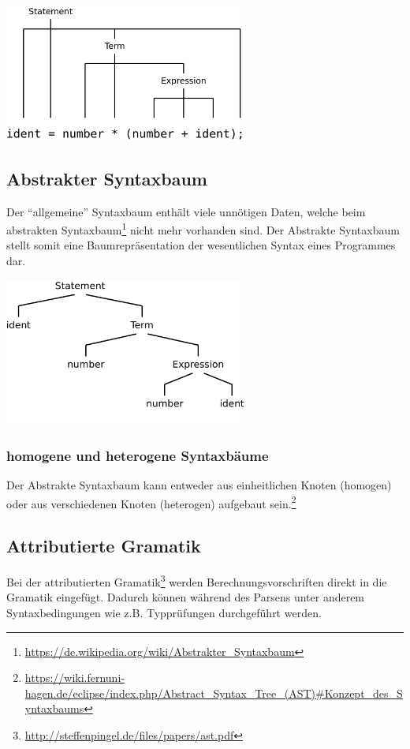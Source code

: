 \includegraphics[width=0.6\textwidth]{./media/images/compiler/parser_syntaxtree.png}

\subsection{Abstrakter Syntaxbaum}

Der ``allgemeine'' Syntaxbaum enth\"alt viele unn\"otigen Daten, welche beim abstrakten Syntaxbaum\footnote{\url{https://de.wikipedia.org/wiki/Abstrakter_Syntaxbaum}} nicht mehr vorhanden sind. Der Abstrakte Syntaxbaum stellt somit eine Baumrepr\"asentation der wesentlichen Syntax eines Programmes dar.

\includegraphics[width=0.6\textwidth]{./media/images/compiler/abstract_syntaxtree.png}

\subsubsection{homogene und heterogene Syntaxbäume}

Der Abstrakte Syntaxbaum kann entweder aus einheitlichen Knoten (homogen) oder aus verschiedenen Knoten (heterogen) aufgebaut sein.\footnote{\url{https://wiki.fernuni-hagen.de/eclipse/index.php/Abstract_Syntax_Tree_(AST)\#Konzept_des_Syntaxbaums}}

\subsection{Attributierte Gramatik}

Bei der attributierten Gramatik\footnote{\url{http://steffenpingel.de/files/papers/ast.pdf}} werden Berechnungsvorschriften direkt in die Gramatik eingef\"ugt. Dadurch k\"onnen w\"ahrend des Parsens unter anderem Syntaxbedingungen wie z.B. Typpr\"ufungen durchgef\"uhrt werden.

